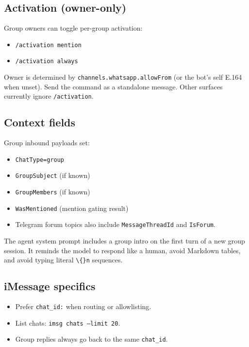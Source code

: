 \subsection{Activation (owner-only)}


Group owners can toggle per-group activation:

\begin{itemize}
  \item \texttt{/activation mention}
  \item \texttt{/activation always}
\end{itemize}


Owner is determined by \texttt{channels.whatsapp.allowFrom} (or the bot’s self E.164 when unset). Send the command as a standalone message. Other surfaces currently ignore \texttt{/activation}.

\subsection{Context fields}


Group inbound payloads set:

\begin{itemize}
  \item \texttt{ChatType=group}
  \item \texttt{GroupSubject} (if known)
  \item \texttt{GroupMembers} (if known)
  \item \texttt{WasMentioned} (mention gating result)
  \item Telegram forum topics also include \texttt{MessageThreadId} and \texttt{IsForum}.
\end{itemize}


The agent system prompt includes a group intro on the first turn of a new group session. It reminds the model to respond like a human, avoid Markdown tables, and avoid typing literal \texttt{\textbackslash\{\}n} sequences.

\subsection{iMessage specifics}


\begin{itemize}
  \item Prefer \texttt{chat\_id:} when routing or allowlisting.
  \item List chats: \texttt{imsg chats --limit 20}.
  \item Group replies always go back to the same \texttt{chat\_id}.
\end{itemize}


